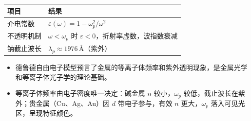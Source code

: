 \begin{formulabox}[答案汇总]
\begin{center}
\begin{tabular}{ll}
\toprule
\textbf{项目} & \textbf{结果} \\
\midrule
介电常数 & $\varepsilon(\omega)=1-\omega_p^2/\omega^2$ \\
不透明机制 & $\omega<\omega_p$ 时 $\varepsilon<0$，折射率虚数，波指数衰减 \\
钠截止波长 & $\lambda_p\approx1976\,\text{\AA}$（紫外） \\
\bottomrule
\end{tabular}
\end{center}
\end{formulabox}

\begin{insightbox}[物理图像]
\begin{itemize}
    \item 德鲁德自由电子模型预言了金属的等离子体频率和紫外透明现象，是金属光学和等离子体光子学的理论基础。
    \item 等离子体频率由电子密度唯一决定：碱金属 $n$ 较小，$\omega_p$ 较低，截止波长在紫外；贵金属（Cu、Ag、Au）因 $d$ 带电子参与，有效 $n$ 更大，$\omega_p$ 落入可见光区，呈现特征颜色。
\end{itemize}
\end{insightbox}
